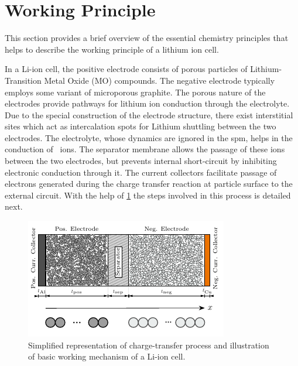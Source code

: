 


\section{Working Principle}\label{subsec:liionchemistry}

This section  provides a  brief overview of  the essential  chemistry principles
that helps to describe the working principle of a lithium ion cell.

In  a Li-ion  cell,  the  positive electrode  consists  of  porous particles  of
Lithium-Transition Metal Oxide (MO)  compounds. The negative electrode typically
employs  some  variant  of  microporous  graphite.  The  porous  nature  of  the
electrodes provide pathways for lithium  ion conduction through the electrolyte.
Due  to  the  special  construction  of the  electrode  structure,  there  exist
interstitial  sites  which act  as  intercalation  spots for  Lithium  shuttling
between the two  electrodes. The electrolyte, whose dynamics are  ignored in the
\gls{spm}, helps  in the  conduction of ~ions. The  separator membrane
allows  the passage  of  these ions  between the  two  electrodes, but  prevents
internal  short-circuit  by inhibiting  electronic  conduction  through it.  The
current collectors facilitate  passage of electrons generated  during the charge
transfer reaction  at particle surface  to the  external circuit. With  the help
of \cref{fig:chargetransferprocess}  the  steps  involved  in  this  process  is
detailed next.

\begin{figure}[!htbp]
    \centering
    \includegraphics{cropped_cell_sandwich_for_thesis}
    \caption[Charge-transer and basic working mechanism of a Li-ion cell]{Simplified representation of charge-transfer
    process and illustration of basic working mechanism of a Li-ion cell.}
    \label{fig:chargetransferprocess}
\end{figure}

